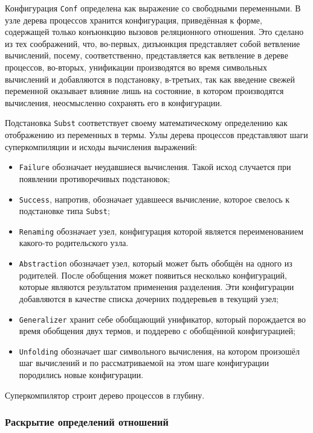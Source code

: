 Конфигурация \lstinline{Conf} определена как выражение со свободными переменными.
В узле дерева процессов хранится конфигурация, приведённая к форме, содержащей только конъюнкцию вызовов
реляционного отношения. Это сделано из тех соображений, что, во-первых, дизъюнкция представляет
собой ветвление вычислений, посему, соответственно, представляется как ветвление в дереве процессов,
во-вторых, унификации производятся во время символьных вычислений и добавляются в подстановку,
в-третьих, так как введение свежей переменной оказывает влияние лишь на состояние, в котором производятся вычисления,
неосмысленно сохранять его в конфигурации.

Подстановка \lstinline{Subst} соответствует своему математическому определению
как отображению из переменных в термы.
Узлы дерева процессов представляют шаги суперкомпиляции и исходы вычисления выражений:
\begin{itemize}
\item \lstinline{Failure} обозначает неудавшиеся вычисления. Такой исход
      случается при появлении противоречивых подстановок;
\item \lstinline{Success}, напротив, обозначает удавшееся вычисление, которое свелось к подстановке типа \lstinline{Subst};
\item \lstinline{Renaming} обозначает узел, конфигурация которой является переименованием какого-то родительского узла.
\item \lstinline{Abstraction} обозначает узел, который может быть обобщён на одного из
      родителей. После обобщения может появиться несколько конфигураций, которые являются
      результатом применения разделения. Эти конфигурации добавляются в качестве списка
      дочерних поддеревьев в текущий узел;
\item \lstinline{Generalizer} хранит себе обобщающий унификатор, который порождается во время обобщения
      двух термов, и поддерево с обобщённой конфигурацией;
\item \lstinline{Unfolding} обозначает шаг символьного вычисления, на котором произошёл шаг вычислений
      и по рассматриваемой на этом шаге конфигурации породились новые конфигурации.
\end{itemize}

Суперкомпилятор строит дерево процессов в глубину.

\subsubsection{Раскрытие определений отношений}

